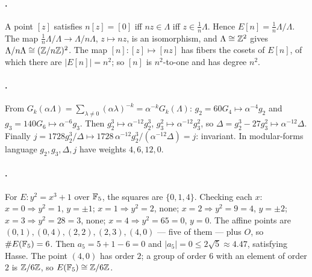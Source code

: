 \paragraph{.}
A point \([z]\) satisfies \(n[z] = [0]\) iff \(nz \in \Lambda\) iff
\(z \in \tfrac1n\Lambda\). Hence \(E[n] = \tfrac1n\Lambda/\Lambda\). The map
\(\tfrac1n\Lambda/\Lambda \to \Lambda/n\Lambda\), \(z \mapsto nz\), is an
isomorphism, and \(\Lambda \cong \mathbb{Z}^2\) gives \(\Lambda/n\Lambda \cong (\mathbb{Z}/n\mathbb{Z})^2\).
The map \([n]: [z] \mapsto [nz]\) has fibers the cosets of \(E[n]\), of which there
are \(|E[n]| = n^2\); so \([n]\) is \(n^2\)-to-one and has degree \(n^2\).

\paragraph{.}
From \(G_k(\alpha\Lambda) = \sum_{\lambda\ne0}(\alpha\lambda)^{-k} =
\alpha^{-k} G_k(\Lambda)\): \(g_2 = 60 G_4 \mapsto \alpha^{-4} g_2\) and
\(g_3 = 140 G_6 \mapsto \alpha^{-6} g_3\). Then \(g_2^3 \mapsto \alpha^{-12} g_2^3\),
\(g_3^2 \mapsto \alpha^{-12} g_3^2\), so \(\Delta = g_2^3 - 27 g_3^2 \mapsto
\alpha^{-12}\Delta\). Finally \(j = 1728 g_2^3/\Delta \mapsto
1728\,\alpha^{-12}g_2^3 / (\alpha^{-12}\Delta) = j\): invariant. In modular-forms
language \(g_2, g_3, \Delta, j\) have weights \(4, 6, 12, 0\).

\paragraph{.}
For \(E : y^2 = x^3 + 1\) over \(\mathbb{F}_5\), the squares are \(\{0,1,4\}\). Checking
each \(x\): \(x=0 \Rightarrow y^2 = 1\), \(y = \pm1\); \(x=1 \Rightarrow y^2 = 2\),
none; \(x=2 \Rightarrow y^2 = 9 = 4\), \(y = \pm2\); \(x=3 \Rightarrow y^2 = 28 =
3\), none; \(x=4 \Rightarrow y^2 = 65 = 0\), \(y = 0\). The affine points are
\((0,1), (0,4), (2,2), (2,3), (4,0)\) --- five of them --- plus \(O\), so
\(\#E(\mathbb{F}_5) = 6\). Then \(a_5 = 5 + 1 - 6 = 0\) and \(|a_5| = 0 \le 2\sqrt5 \approx
4.47\), satisfying Hasse. The point \((4,0)\) has order \(2\); a group of order \(6\)
with an element of order \(2\) is \(\mathbb{Z}/6\mathbb{Z}\), so \(E(\mathbb{F}_5) \cong \mathbb{Z}/6\mathbb{Z}\).
